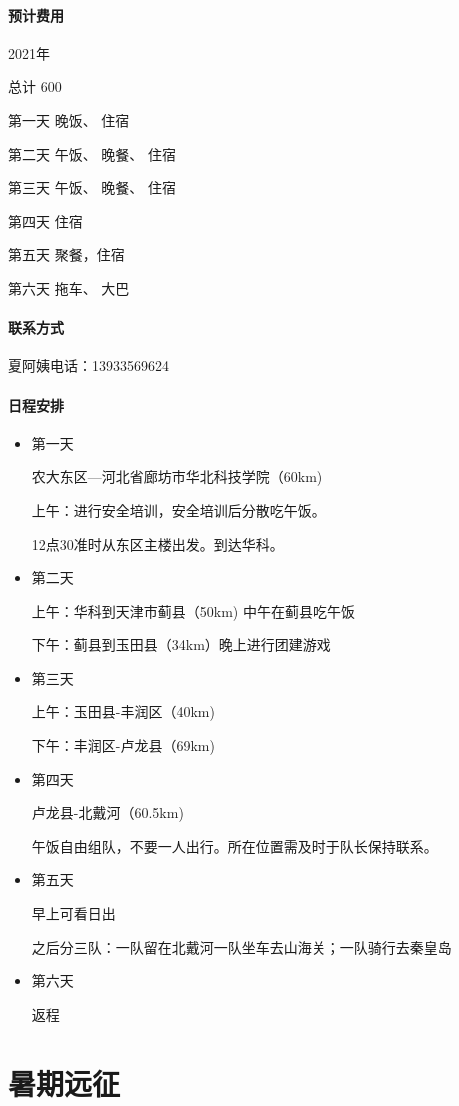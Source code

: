 \documentclass{ctexbook}
\begin{document}
\subsubsection{预计费用}
2021年

总计 600 

第一天 晚饭、 住宿

第二天 午饭、 晚餐、 住宿

第三天 午饭、 晚餐、 住宿

第四天 住宿

第五天 聚餐，住宿

第六天 拖车、 大巴
\subsubsection{联系方式}
夏阿姨电话：13933569624
\subsubsection{日程安排}
\begin{itemize}
    \item 第一天
    
农大东区—河北省廊坊市华北科技学院（60km)

上午：进行安全培训，安全培训后分散吃午饭。

12点30准时从东区主楼出发。到达华科。
\item 第二天

上午：华科到天津市蓟县（50km) 中午在蓟县吃午饭

下午：蓟县到玉田县（34km）晚上进行团建游戏

\item 第三天

上午：玉田县-丰润区（40km)

下午：丰润区-卢龙县（69km)

\item 第四天

卢龙县-北戴河（60.5km)

午饭自由组队，不要一人出行。所在位置需及时于队长保持联系。

\item 第五天

早上可看日出

之后分三队：一队留在北戴河一队坐车去山海关；一队骑行去秦皇岛

\item 第六天

返程
\end{itemize}


\chapter{暑期远征}
\end{document}
